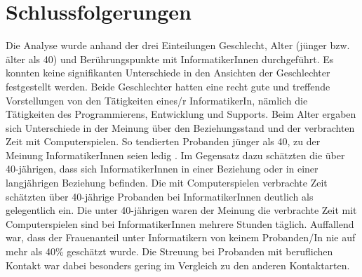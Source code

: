 \documentclass[de]{agse-empir-report}\usepackage[]{graphicx}\usepackage[]{color}
\begin{document}
\section[at]{Schlussfolgerungen}
Die Analyse wurde anhand der drei Einteilungen Geschlecht, Alter (jünger bzw. älter als 40) und Berührungspunkte mit InformatikerInnen durchgeführt. Es konnten keine signifikanten Unterschiede in den Ansichten der Geschlechter festgestellt werden. Beide Geschlechter hatten eine recht gute und treffende Vorstellungen von den Tätigkeiten eines/r InformatikerIn, nämlich die Tätigkeiten des Programmierens, Entwicklung und Supports.
Beim Alter ergaben sich Unterschiede in der Meinung über den Beziehungsstand und der verbrachten Zeit mit Computerspielen. So tendierten Probanden jünger als 40, zu der Meinung InformatikerInnen seien ledig . Im Gegensatz dazu schätzten die über 40-jährigen, dass sich InformatikerInnen in einer Beziehung oder in einer langjährigen Beziehung befinden. Die mit Computerspielen verbrachte Zeit schätzten über 40-jährige Probanden bei InformatikerInnen deutlich als gelegentlich ein. Die unter 40-jährigen waren der Meinung die verbrachte Zeit mit Computerspielen sind bei InformatikerInnen mehrere Stunden täglich. Auffallend war, dass der Frauenanteil unter Informatikern von keinem Probanden/In nie auf mehr als 40\% geschätzt wurde. Die Streuung bei Probanden mit beruflichen Kontakt war dabei besonders gering im Vergleich zu den anderen Kontaktarten. 
\end{document}
